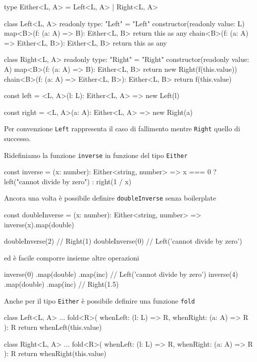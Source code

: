 \documentclass[12pt]{article}
\theoremstyle{definition}
\newenvironment{code}
  {\vspace{0.5cm} \VerbatimEnvironment\begin{typescriptcode}}
  {\end{typescriptcode} \vspace{0.2cm}}
\begin{document}
\begin{code}
type Either<L, A> = Left<L, A> | Right<L, A>

class Left<L, A> {
  readonly type: "Left" = "Left"
  constructor(readonly value: L) {}
  map<B>(f: (a: A) => B): Either<L, B> {
    return this as any
  }
  chain<B>(f: (a: A) => Either<L, B>): Either<L, B> {
    return this as any
  }
}

class Right<L, A> {
  readonly type: "Right" = "Right"
  constructor(readonly value: A) {}
  map<B>(f: (a: A) => B): Either<L, B> {
    return new Right(f(this.value))
  }
  chain<B>(f: (a: A) => Either<L, B>): Either<L, B> {
    return f(this.value)
  }
}

const left = <L, A>(l: L): Either<L, A> =>
  new Left(l)

const right = <L, A>(a: A): Either<L, A> =>
  new Right(a)
\end{code}

Per convenzione \texttt{Left} rappresenta il caso di fallimento mentre \texttt{Right} quello di successo.

Ridefiniamo la funzione \texttt{inverse} in funzione del tipo \texttt{Either}

\begin{code}
const inverse = (x: number): Either<string, number> =>
  x === 0 ? left("cannot divide by zero") : right(1 / x)
\end{code}

Ancora una volta è possibile definire \texttt{doubleInverse} senza boilerplate

\begin{code}
const doubleInverse = (x: number): Either<string, number> =>
  inverse(x).map(double)

doubleInverse(2) // Right(1)
doubleInverse(0) // Left('cannot divide by zero')
\end{code}

ed è facile comporre insieme altre operazioni

\begin{code}
inverse(0)
  .map(double)
  .map(inc) // Left('cannot divide by zero')
inverse(4)
  .map(double)
  .map(inc) // Right(1.5)
\end{code}

Anche per il tipo \texttt{Either} è possibile definire una funzione \texttt{fold}

\begin{code}
class Left<L, A> {
  ...
  fold<R>(
    whenLeft: (l: L) => R,
    whenRight: (a: A) => R
  ): R {
    return whenLeft(this.value)
  }
}

class Right<L, A> {
  ...
  fold<R>(
    whenLeft: (l: L) => R,
    whenRight: (a: A) => R
  ): R {
    return whenRight(this.value)
  }
}
\end{code}
\end{document}
